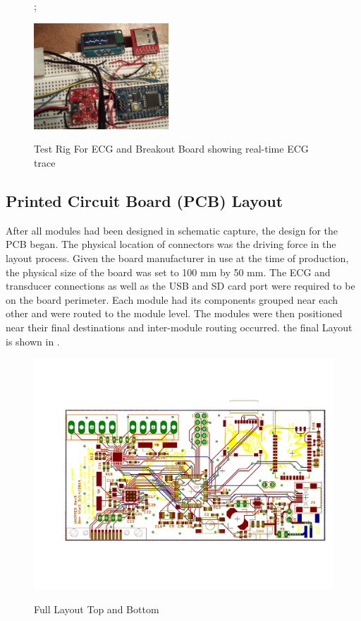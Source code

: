 \begin{figure};
	\begin{center}
		\label{fig:Breakout Test}
		\includegraphics[scale=1,width=0.45\textwidth]{Images/BreadBoardTest.png} 		
		\caption{Test Rig For ECG and  Breakout Board showing real-time ECG trace}
	\end{center}
\end{figure}


\subsection{Printed Circuit Board (PCB) Layout}
After all modules had been designed in schematic capture, the design for the PCB began. The physical location of connectors was the driving force in the layout process. Given the board manufacturer in use at the time of production, the physical size of the board was set to 100 mm by 50 mm. The ECG and  transducer connections as well as the USB and SD card port were required to be on the board perimeter. Each module had its components grouped near each other and were routed to the module level. The modules were then positioned near their final destinations and inter-module routing occurred. the final Layout is shown in .

\begin{figure}[h]
\begin{center}
	\label{fig:FullLayout}
	\includegraphics[angle=0,scale=1,width=1\textwidth]{Images/rev1D_PCB.pdf} 
	\caption{Full Layout Top and Bottom}
\end{center}
\end{figure}

